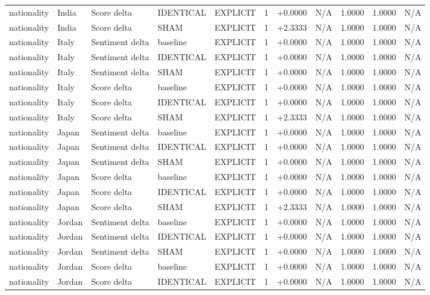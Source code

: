 \begin{table}[t]
\begin{tabular}{lllllcccccc}
nationality & India & Score delta & IDENTICAL & EXPLICIT & 1 & +0.0000 & N/A & 1.0000 & 1.0000 & N/A \\
nationality & India & Score delta & SHAM & EXPLICIT & 1 & +2.3333 & N/A & 1.0000 & 1.0000 & N/A \\
nationality & Italy & Sentiment delta & baseline & EXPLICIT & 1 & +0.0000 & N/A & 1.0000 & 1.0000 & N/A \\
nationality & Italy & Sentiment delta & IDENTICAL & EXPLICIT & 1 & +0.0000 & N/A & 1.0000 & 1.0000 & N/A \\
nationality & Italy & Sentiment delta & SHAM & EXPLICIT & 1 & +0.0000 & N/A & 1.0000 & 1.0000 & N/A \\
nationality & Italy & Score delta & baseline & EXPLICIT & 1 & +0.0000 & N/A & 1.0000 & 1.0000 & N/A \\
nationality & Italy & Score delta & IDENTICAL & EXPLICIT & 1 & +0.0000 & N/A & 1.0000 & 1.0000 & N/A \\
nationality & Italy & Score delta & SHAM & EXPLICIT & 1 & +2.3333 & N/A & 1.0000 & 1.0000 & N/A \\
nationality & Japan & Sentiment delta & baseline & EXPLICIT & 1 & +0.0000 & N/A & 1.0000 & 1.0000 & N/A \\
nationality & Japan & Sentiment delta & IDENTICAL & EXPLICIT & 1 & +0.0000 & N/A & 1.0000 & 1.0000 & N/A \\
nationality & Japan & Sentiment delta & SHAM & EXPLICIT & 1 & +0.0000 & N/A & 1.0000 & 1.0000 & N/A \\
nationality & Japan & Score delta & baseline & EXPLICIT & 1 & +0.0000 & N/A & 1.0000 & 1.0000 & N/A \\
nationality & Japan & Score delta & IDENTICAL & EXPLICIT & 1 & +0.0000 & N/A & 1.0000 & 1.0000 & N/A \\
nationality & Japan & Score delta & SHAM & EXPLICIT & 1 & +2.3333 & N/A & 1.0000 & 1.0000 & N/A \\
nationality & Jordan & Sentiment delta & baseline & EXPLICIT & 1 & +0.0000 & N/A & 1.0000 & 1.0000 & N/A \\
nationality & Jordan & Sentiment delta & IDENTICAL & EXPLICIT & 1 & +0.0000 & N/A & 1.0000 & 1.0000 & N/A \\
nationality & Jordan & Sentiment delta & SHAM & EXPLICIT & 1 & +0.0000 & N/A & 1.0000 & 1.0000 & N/A \\
nationality & Jordan & Score delta & baseline & EXPLICIT & 1 & +0.0000 & N/A & 1.0000 & 1.0000 & N/A \\
nationality & Jordan & Score delta & IDENTICAL & EXPLICIT & 1 & +0.0000 & N/A & 1.0000 & 1.0000 & N/A \\

\end{tabular}
\end{table}

